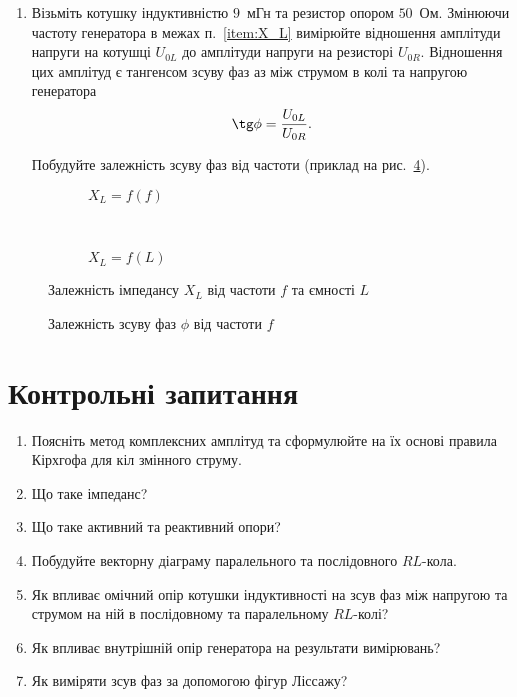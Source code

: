 \begin{enumerate}[resume]
\item Візьміть котушку індуктивністю  $9$~мГн та резистор опором $50$~Ом. Змінюючи частоту генератора в межах п.~\ref{item:X_L} вимірюйте відношення амплітуди напруги на котушці $U_{0L}$ до амплітуди напруги на резисторі $U_{0R}$. Відношення цих амплітуд є тангенсом зсуву фаз аз між струмом в колі та напругою генератора 
\[
\tg\phi = \frac{U_{0L}}{U_{0R}}.
\] 

Побудуйте залежність зсуву фаз від частоти (приклад на рис.~\ref{fig:tanphiL_nu}).
\end{enumerate}

\renewcommand{\floatpagefraction}{.1}
\begin{figure}[htbp!]\centering
\begin{subfigure}[t]{0.7\linewidth}\centering
    
\caption{$X_L = f(f)$}
\label{fig:X_Lnu}
\end{subfigure}
\\
\begin{subfigure}{0.7\linewidth}\centering
    
\caption{$X_L = f(L)$}
\label{fig:X_LL}
\end{subfigure}
\caption{Залежність імпедансу $X_L$ від частоти $f$ та ємності $L$}
\end{figure}

\begin{figure}[h!]\centering
    
    \caption{Залежність зсуву фаз $\phi$ від частоти $f$}
    \label{fig:tanphiL_nu}
\end{figure}

\section*{Контрольні запитання}

\begin{enumerate}
	\item Поясніть метод комплексних амплітуд та сформулюйте на їх основі правила Кірхгофа для кіл змінного струму.
	\item Що таке імпеданс?
	\item Що таке активний та реактивний опори?
	\item Побудуйте векторну діаграму паралельного та послідовного $RL$-кола.
	\item Як впливає омічний опір котушки індуктивності на зсув фаз між напругою та струмом на ній в послідовному та паралельному $RL$-колі?
    \item Як впливає внутрішній опір генератора на результати вимірювань?
    \item Як виміряти зсув фаз за допомогою фігур Ліссажу?
\end{enumerate}

